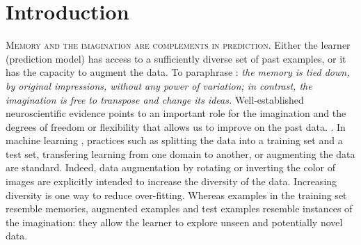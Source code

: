 \documentclass[ecta,nameyear,draft]{econsocart}
\theoremstyle{plain}
\theoremstyle{remark}
\begin{document}



 
\section{Introduction} \label{sec-introduction}
\textsc{Memory and the imagination are complements in prediction}.
Either the learner (prediction model) has access to a sufficiently diverse set of past examples, or it has the capacity to augment the data.
To paraphrase \citep[pages 9 and 10]{hume1896treatise}: \emph{the memory is tied down, by original impressions, without any power of variation; in contrast, the imagination is free to transpose and change its ideas.}
Well-established neuroscientific evidence points to an important role for the imagination and the degrees of freedom or flexibility that allows us to improve on the past data.
\citep{bartlett1932remembering,suddendorf2007evolution,mullally2013memory}.
In machine learning \citep{hastie2009elements,murphy2022probabilistic}, practices such as splitting the data into a training set and a test set, transfering learning from one domain to another, or augmenting the data are standard.
Indeed, data augmentation by rotating or inverting the color of images are explicitly intended to increase the diversity of the data.
Increasing diversity is one way to reduce over-fitting.
Whereas examples in the training set resemble memories, augmented examples and
test examples resemble instances of the imagination: they allow the learner to
explore unseen and potentially novel data.
\end{document}
